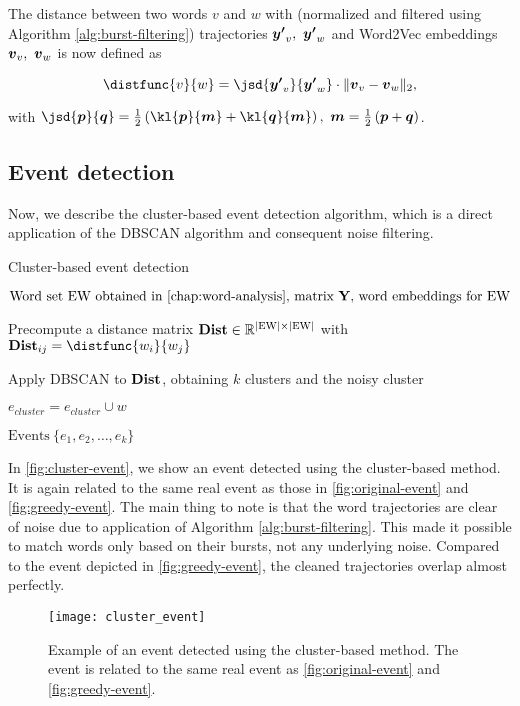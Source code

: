 The distance between two words $v$ and $w$ with (normalized and filtered using Algorithm \ref{alg:burst-filtering}) trajectories $\vect{\trajn}_{v},\ \vect{\trajn}_{w}$ and Word2Vec embeddings $\embed_{v},\ \embed_{w}$ is now defined as

\begin{equation}
	\distfunc{v}{w} = \jsd{\vect{\trajn}_{v}}{\vect{\trajn}_{w}} \cdot \| \embed_{v} - \embed_{w}\|_{2},
\end{equation}

with $\jsd{\vect{p}}{\vect{q}} = \frac{1}{2} \left( \kl{\vect{p}}{\vect{m}} + \kl{\vect{q}}{\vect{m}} \right) ,\ \vect{m} = \frac{1}{2} \left( \vect{p} + \vect{q} \right)$.


\subsection{Event detection}
Now, we describe the cluster-based event detection algorithm, which is a direct application of the DBSCAN algorithm and consequent noise filtering.

\begin{algorithm}[H]
\begin{algorithmic}[1]
\caption{Cluster-based event detection}
\Input $\text{Word set EW obtained in \autoref{chap:word-analysis}, matrix } \trajmat \text{, word embeddings for EW}$

\State Precompute a distance matrix $\mathbf{Dist} \in \mathbb{R}^{\left\vert \text{EW} \right\vert \times \left\vert \text{EW} \right\vert}$ with $\distmat_{ij} = \distfunc{w_{i}}{w_{j}}$

\State Apply DBSCAN to $\mathbf{Dist}$, obtaining $k$ clusters and the noisy cluster

		\State $e_{cluster} = e_{cluster} \cup w$
	\EndIf
\EndFor

\Output $\text{Events} ~ \{ e_{1}, e_{2}, \dots, e_{k} \}$
\end{algorithmic}
\end{algorithm}

In \autoref{fig:cluster-event}, we show an event detected using the cluster-based method. It is again related to the same real event as those in \autoref{fig:original-event} and \autoref{fig:greedy-event}. The main thing to note is that the word trajectories are clear of noise due to application of Algorithm \ref{alg:burst-filtering}. This made it possible to match words only based on their bursts, not any underlying noise. Compared to the event depicted in \autoref{fig:greedy-event}, the cleaned trajectories overlap almost perfectly.

\begin{figure}
  \centering
  \texttt{[image: cluster\_event]}  %
  \caption{Example of an event detected using the cluster-based method. The event is related to the same real event as \autoref{fig:original-event} and \autoref{fig:greedy-event}.}
  \label{fig:cluster-event}
\end{figure}
